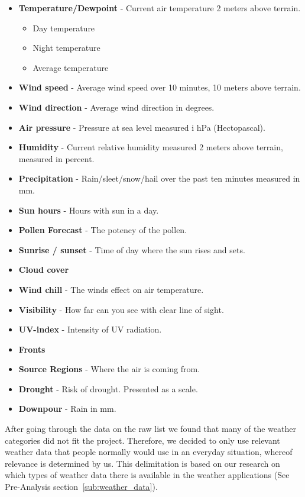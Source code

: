 \begin{itemize}
     \item \textbf{Temperature/Dewpoint} - Current air temperature 2 meters above terrain.
     \begin{itemize}
         \item Day temperature
         \item Night temperature
         \item Average temperature
     \end{itemize}
     \item \textbf{Wind speed} - Average wind speed over 10 minutes, 10 meters above terrain.
     \item \textbf{Wind direction} - Average wind direction in degrees.
     \item \textbf{Air pressure} - Pressure at sea level measured i hPa (Hectopascal).
     \item \textbf{Humidity} - Current relative humidity measured 2 meters above terrain, measured in percent.
     \item \textbf{Precipitation} - Rain/sleet/snow/hail over the past ten minutes measured in mm.
     \item \textbf{Sun hours} - Hours with sun in a day.
     \item \textbf{Pollen Forecast} - The potency of the pollen. 
     \item \textbf{Sunrise / sunset} - Time of day where the sun rises and sets.
     \item \textbf{Cloud cover}
     \item \textbf{Wind chill} - The winds effect on air temperature.
     \item \textbf{Visibility} - How far can you see with clear line of sight.
     \item \textbf{UV-index} - Intensity of UV radiation.
     \item \textbf{Fronts} 
     \item \textbf{Source Regions} - Where the air is coming from.
     \item \textbf{Drought} - Risk of drought. Presented as a scale.
     \item \textbf{Downpour} - Rain in mm.
 \end{itemize}

After going through the data on the raw list we found that many of the weather categories did not fit the project. 
Therefore, we decided to only use relevant weather data that people normally would use in an everyday situation, whereof relevance is determined by us.
This delimitation is based on our research on which types of weather data there is available in the weather applications (See Pre-Analysis section~\ref{sub:weather_data}).

